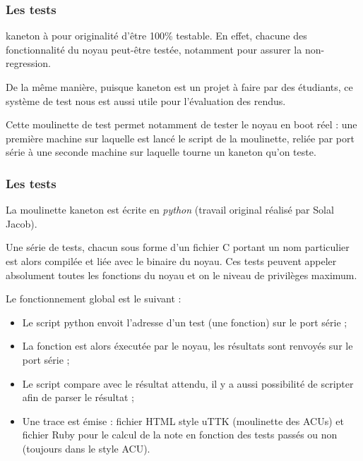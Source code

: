 
\begin{frame}
  \frametitle{Les tests}

  kaneton \`{a} pour originalit\'{e} d'\^{e}tre 100\% testable. En effet, chacune
  des fonctionnalit\'{e} du noyau peut-\^{e}tre test\'{e}e, notamment pour assurer
  la non-regression.

  \-

  De la m\^{e}me mani\`{e}re, puisque kaneton est un projet \`{a} faire par des
  \'{e}tudiants, ce syst\`{e}me de test nous est aussi utile pour l'\'{e}valuation
  des rendus.

  \-

  Cette moulinette de test permet notamment de tester le noyau en boot
  r\'{e}el : une premi\`{e}re machine sur laquelle est lanc\'{e} le script de la
  moulinette, reli\'{e}e par port s\'{e}rie \`{a} une seconde machine sur laquelle
  tourne un kaneton qu'on teste.

\end{frame}


\begin{frame}
  \frametitle{Les tests}

  La moulinette kaneton est \'{e}crite en \emph{python} (travail original
  r\'{e}alis\'{e} par Solal Jacob).

  \-

  Une s\'{e}rie de tests, chacun sous forme d'un fichier C portant un nom
  particulier est alors compil\'{e}e et li\'{e}e avec le binaire du noyau. Ces
  tests peuvent appeler absolument toutes les fonctions du noyau et on
  le niveau de privil\`{e}ges maximum.

  \-

  Le fonctionnement global est le suivant :

  \begin{itemize}
  \item
    Le script python envoit l'adresse d'un test (une fonction) sur le
    port s\'{e}rie ;
  \item
    La fonction est alors \'{e}xecut\'{e}e par le noyau, les r\'{e}sultats sont
    renvoy\'{e}s sur le port s\'{e}rie ;
  \item
    Le script compare avec le r\'{e}sultat attendu, il y a aussi
    possibilit\'{e} de scripter afin de parser le r\'{e}sultat ;
  \item
    Une trace est \'{e}mise : fichier HTML style uTTK (moulinette des
    ACUs) et fichier Ruby pour le calcul de la note en fonction des
    tests pass\'{e}s ou non (toujours dans le style ACU).
  \end{itemize}

\end{frame}

